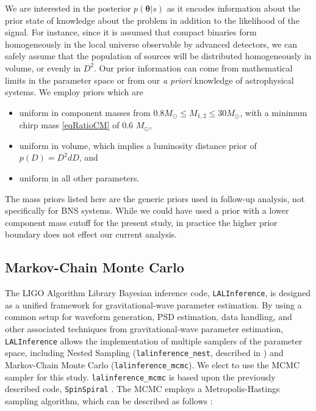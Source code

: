 \documentclass[11pt,a4paper]{emulateapj}
\newcommand{\thpara}{\boldsymbol{\theta}}
\begin{document}
We are interested in the posterior $p(\thpara | s)$ as it encodes information about the
prior state of knowledge about the problem in addition to the likelihood of the signal.
  For instance, since it is assumed that compact binaries
form homogeneously in the local universe observable by advanced detectors,
 we can safely assume that the population of
sources will be distributed homogeneously in volume, or evenly in $D^2$. 
 Our prior information can come from mathematical limits in the parameter space or
from our \textit{a priori} knowledge of astrophysical systems.  We employ priors which are

\begin{itemize}
\item uniform in component masses from $0.8M_{\odot} \leq M_{1,2} \leq 30M_{\odot}$, with a minimum chirp mass  \eqref{eqRatioCM} of 0.6 $M_{\odot}$,
\item uniform in volume, which implies a luminosity distance prior of $p(D) = D^2 dD$, and
\item uniform in all other parameters.
\end{itemize}

\noindent  The mass priors listed here are the generic priors used in follow-up analysis, not specifically for BNS systems.  While we could have used a prior with a lower component mass cutoff for the present study, in practice the higher prior boundary does not effect our current analysis.


  
\subsection{Markov-Chain Monte Carlo}
\label{MCMCSection}
  
The LIGO Algorithm Library Bayesian inference code, \texttt{LALInference}, is designed as 
a unified framework for gravitational-wave parameter estimation.  By using a common setup for 
waveform generation, PSD estimation, data handling, and other associated techniques from gravitational-wave parameter estimation, \texttt{LALInference} allows the implementation of multiple samplers of the parameter space, including Nested Sampling (\texttt{lalinference\_nest}, described in \cite{nestedsampling2010}) and Markov-Chain Monte Carlo (\texttt{lalinference\_mcmc}).  We elect to use the MCMC sampler for this study.  \texttt{lalinference\_mcmc} is based upon the previously described code, 
\texttt{SpinSpiral} \citep{spinspiral2009, spinspiral2010}.  The MCMC employs a Metropolis-Hastings sampling algorithm, which can be described as follows \citep{Gilks99}:
  
\end{document}
